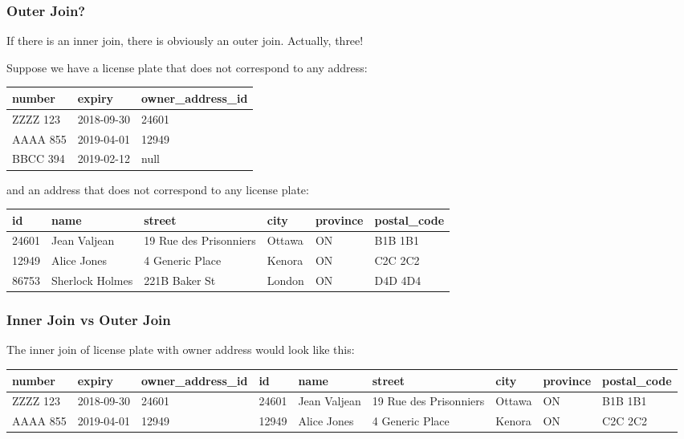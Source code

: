 \begin{frame}
\frametitle{Outer Join?}

If there is an inner join, there is obviously an outer join. Actually, three!

Suppose we have a license plate that does not correspond to any address: 

{\scriptsize
\begin{center}
\begin{tabular}{|l|l|l|}\hline
	\textbf{number} & \textbf{expiry} & \textbf{owner\_address\_id} \\ \hline
	ZZZZ 123 & 2018-09-30 & 24601 \\ \hline
	AAAA 855 & 2019-04-01 & 12949 \\ \hline
	BBCC 394 & 2019-02-12 & null \\ \hline
\end{tabular}
\end{center}
}

and an address that does not correspond to any license plate:

{\scriptsize
\begin{center}
	\begin{tabular}{|l|l|l|l|l|l|}\hline
		\textbf{id} & \textbf{name} &\textbf{street} & \textbf{city} & \textbf{province} & \textbf{postal\_code} \\ \hline
		24601 & Jean Valjean & 19 Rue des Prisonniers & Ottawa & ON & B1B 1B1\\ \hline
		12949 & Alice Jones & 4 Generic Place & Kenora & ON & C2C 2C2\\ \hline
		86753 & Sherlock Holmes & 221B Baker St & London & ON & D4D 4D4\\ \hline
	\end{tabular}
\end{center}
}

\end{frame}


\begin{frame}
\frametitle{Inner Join vs Outer Join}

The inner join of license plate with owner address would look like this: 

{\tiny
\begin{center}
	\begin{tabular}{|l|l|l|l|l|l|l|l|l|}\hline
		\textbf{number} & \textbf{expiry} & \textbf{owner\_address\_id} & \textbf{id} & \textbf{name} &\textbf{street} & \textbf{city} & \textbf{province} & \textbf{postal\_code} \\ \hline
		ZZZZ 123 & 2018-09-30 & 24601 & 24601 & Jean Valjean & 19 Rue des Prisonniers & Ottawa & ON & B1B 1B1\\ \hline
		AAAA 855 & 2019-04-01 & 12949 & 12949 & Alice Jones & 4 Generic Place & Kenora & ON & C2C 2C2\\ \hline
	\end{tabular}
\end{center}
}


\end{frame}



